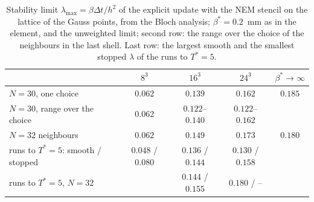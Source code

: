 \begin{table}[htbp]
  \centering
  \caption[Stability limit of the NEM stencil]{Stability limit
    $\lambda_{\max}=\beta\Delta t/h^2$ of the explicit update with the NEM
    stencil on the lattice of the Gauss points, from the Bloch analysis;
    $\beta^*=0.2$~mm as in the element, and the unweighted limit; second
    row: the range over the choice of the neighbours in the last shell. Last
    row: the largest smooth and the smallest stopped $\lambda$ of the runs to
    $T^*=5$.}
  \label{tab:app-stability}
  \small
  \begin{tabular}{lcccc}
    \toprule
    & $8^3$ & $16^3$ & $24^3$ & $\beta^*\to\infty$ \\
    \midrule
    $N=30$, one choice & $0.062$ & $0.139$ & $0.162$ & $0.185$ \\
    $N=30$, range over the choice & $0.062$ & $0.122$--$0.140$ & $0.122$--$0.162$ & \\
    $N=32$ neighbours & $0.062$ & $0.149$ & $0.173$ & $0.180$ \\
    runs to $T^*=5$: smooth / stopped & $0.048$ / $0.080$ & $0.136$ / $0.144$ & $0.130$ / $0.158$ & \\
    runs to $T^*=5$, $N=32$ & & $0.144$ / $0.155$ & $0.180$ / -- & \\
    \bottomrule
  \end{tabular}
\end{table}

